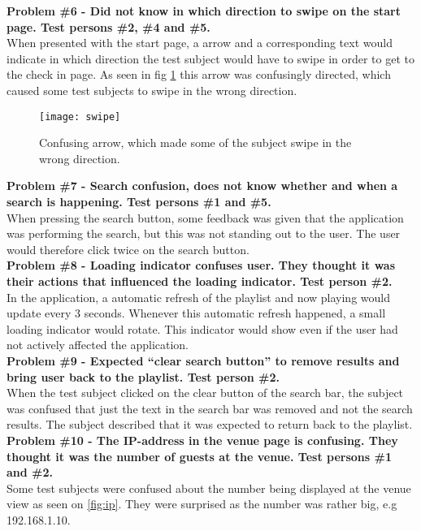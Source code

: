 \noindent\textbf{Problem \#6 - Did not know in which direction to swipe on the start page. Test
    persons \#2, \#4 and \#5.}\\
  When presented with the start page, a arrow and a corresponding text
  would indicate in which direction the test subject would have to
  swipe in order to get to the check in page. As seen in fig \cref{fig:swipe} this arrow was confusingly
  directed, which caused some test subjects to swipe in the wrong direction.\\

\begin{figure}[hbtp]
  \centering
  \texttt{[image: swipe]}
  \caption{Confusing arrow, which made some of the subject swipe in the wrong direction.}\label{fig:swipe}
\end{figure}

\noindent\textbf{Problem \#7 - Search confusion, does not know whether and when a search is
    happening. Test persons \#1 and \#5.}\\
  When pressing the search button, some feedback was given that the
  application was performing the search, but this was not standing out
  to the user. The user would therefore click twice on the search button.\\

\noindent\textbf{Problem \#8 - Loading indicator confuses user. They thought it was their actions
    that influenced the loading indicator. Test person \#2.}\\
  In the application, a automatic refresh of the playlist and
  now playing would update every 3 seconds. Whenever this automatic
  refresh happened, a small loading indicator would rotate. This
  indicator would show even if the user had not actively affected the application.\\

\noindent\textbf{Problem \#9 - Expected \enquote{clear search button}
  to remove results and bring user back to the playlist. Test person \#2.}\\
  When the test subject clicked on the clear button of the search bar,
  the subject was confused that just the text in the search bar was
  removed and not the search results. The subject described that it
  was expected to return back to the playlist.\\


\noindent\textbf{Problem \#10 - The IP-address in the venue page is
  confusing. They thought it was the number of guests at the venue. Test persons \#1 and \#2.}\\
  Some test subjects were confused about the number being displayed at
  the venue view as seen on \cref{fig:ip}. They were surprised as the number was rather big,
  e.g 192.168.1.10.\\

